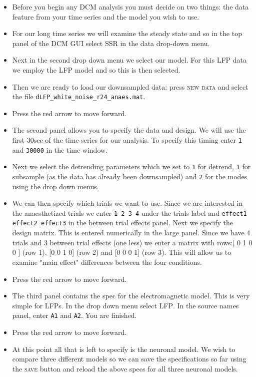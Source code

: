 \begin{itemize}
\item Before you begin any DCM analysis you must decide on two things: the data feature from your time series and the model you wish to use.
\item For our long time series we will examine the steady state and so in the top panel of the DCM GUI select \textsc{SSR} in the data drop-down menu.
\item Next in the second drop down menu we select our model. For this LFP data we employ the \textsc{LFP} model and so this is then selected. 
\item Then we are ready to load our downsampled data: press \textsc{new data} and select the file \texttt{dLFP\_white\_noise\_r24\_anaes.mat}.
\item Press the red arrow to move forward.
\item The second panel allows you to specify the data and design. We will use the first 30sec of the time series for our analysis. To specify this timing enter \texttt{1} and \texttt{30000} in the time window.
\item Next we select the detrending parameters which we set to \texttt{1} for detrend, \texttt{1} for subsample (as the data has already been downsampled) and \texttt{2} for the modes using the drop down menus.
\item We can then specify which trials we want to use. Since we are interested in the anaesthetized trials we enter \texttt{1 2 3 4} under the trials label and \texttt{effect1 effect2 effect3} in the between trial effects panel. Next we specify the design matrix. This is entered numerically in the large panel. Since we have 4 trials and 3 between trial effects (one less) we enter a matrix with rows:[ 0 1 0 0 ] (row 1), [0 0 1 0] (row 2) and [0 0 0 1] (row 3). This will allow us to examine "main effect" differences between the four conditions.
\item Press the red arrow to move forward.
\item The third panel contains the spec for the electromagnetic model. This is very simple for LFPs. In the drop down menu select \textsc{LFP}. In the source names panel, enter \texttt{A1} and \texttt{A2}. You are finished.
\item Press the red arrow to move forward.
\item At this point all that is left to specify is the neuronal model. We wish to compare three different models so we can save the specifications so far using the \textsc{save} button and reload the above specs for all three neuronal models.

\end{itemize}
